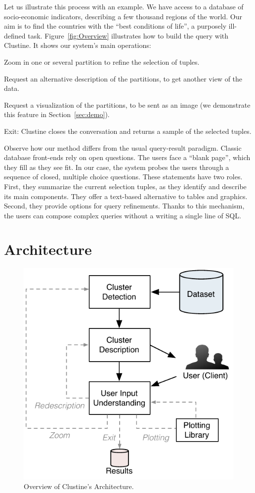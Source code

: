 Let us illustrate this process with an example. We have access to a database of
socio-economic indicators, describing a few thousand regions of the world.  Our
aim is to find the countries with the ``best conditions of life'', a purposely
ill-defined task.  Figure~\ref{fig:Overview} illustrates how to build the query
with Clustine.  It shows our system's main operations: 
\begin{itemize0}
    \item Zoom in one or several partition to refine the selection of
        tuples. 
    \item Request an alternative description of
        the partitions, to get another view of the data.
    \item Request a visualization of the partitions, to be sent as an
        image (we demonstrate this feature in
        Section~\ref{sec:demo}).
    \item Exit: Clustine closes the conversation and returns
        a sample of the selected tuples.
\end{itemize0}
Observe how our method differs from the usual query-result paradigm. Classic
database front-ends rely on open questions. The users face a ``blank page'',
which they fill as they see fit. In our case, the system probes the users
through a sequence of closed, multiple choice questions. These statements have
two roles. First, they summarize the current selection tuples, as they identify
and describe its main components. They offer a text-based alternative to
tables and graphics. Second, they provide options for query refinements. Thanks to
this mechanism, the users can compose complex queries without a writing a
single line of SQL.


\section{Architecture}
\label{sec:architecture}

\begin{figure}[t!]
  \centering
  \includegraphics[width=.7\columnwidth]{Architecture}
  \caption{Overview of Clustine's Architecture.}
  \label{fig:architecture}
\end{figure}

